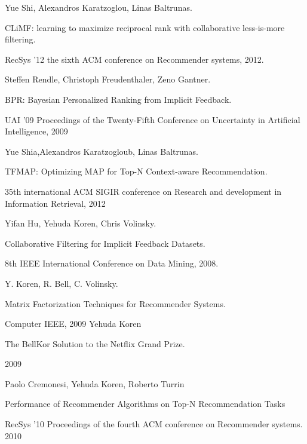 \documentclass[a4paper,12pt]{article}
\begin{document}
	\begin{thebibliography}{00} %
    	
    	Yue Shi, Alexandros Karatzoglou, Linas Baltrunas.
    	
CLiMF: learning to maximize reciprocal rank with collaborative less-is-more filtering. 	
    	
    RecSys '12 the sixth ACM conference on Recommender systems, 2012.    	
    	
         
	     Steffen Rendle, Christoph Freudenthaler, Zeno Gantner.    
         
         BPR: Bayesian Personalized Ranking from Implicit Feedback.
         
         UAI '09 Proceedings of the Twenty-Fifth Conference on Uncertainty in Artificial Intelligence, 2009
         
		
		Yue Shia,Alexandros Karatzogloub, Linas Baltrunas.
		
TFMAP: Optimizing MAP for Top-N Context-aware Recommendation.		
		
		35th international ACM SIGIR conference on Research and development in Information Retrieval, 2012
		
	Yifan Hu, Yehuda Koren, Chris Volinsky.
	
	Collaborative Filtering for Implicit Feedback Datasets.
	
	8th IEEE International Conference on Data Mining, 2008.
	
	
	Y. Koren, R. Bell, C. Volinsky.	
	
	Matrix Factorization Techniques for Recommender Systems.
	
	Computer IEEE, 2009
	Yehuda Koren
	
	The BellKor Solution to the Netflix Grand Prize. 
	
	2009

	
    Paolo Cremonesi, Yehuda Koren, Roberto Turrin	
	
	Performance of Recommender Algorithms on Top-N Recommendation Tasks
	
	RecSys '10 Proceedings of the fourth ACM conference on Recommender systems. 2010
	
	
\end{thebibliography}
\end{document}
